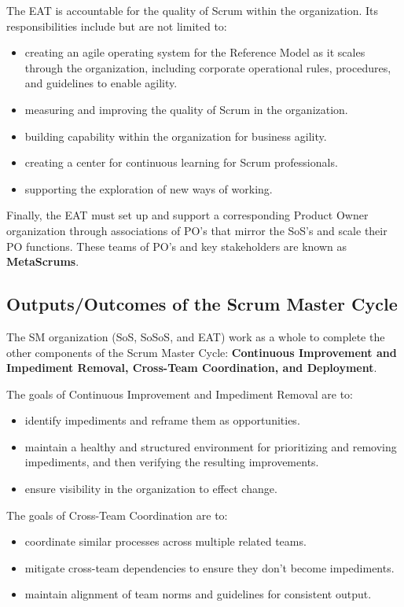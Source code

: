 \documentclass[12pt,a4paper,parskip=full]{scrartcl}
\begin{document}
The EAT is accountable for the quality of Scrum within the organization.
Its responsibilities include but are not limited to:
\begin{itemize}
\item creating an agile operating system for the Reference Model as it
scales through the organization, including corporate operational rules,
procedures, and guidelines to enable agility.
\item measuring and improving the quality of Scrum in the organization.
\item building capability within the organization for business agility.
\item creating a center for continuous learning for Scrum professionals.
\item supporting the exploration of new ways of working.
\end{itemize}
Finally, the EAT must set up and support a corresponding Product Owner
organization through associations of PO's that mirror the SoS's and scale
their PO functions. These teams of PO's and key stakeholders are known as
\textbf{MetaScrums}.

\subsection{Outputs/Outcomes of the Scrum Master Cycle}
The SM organization (SoS, SoSoS, and EAT) work as a whole to complete the
other components of the Scrum Master Cycle: \textbf{Continuous Improvement
and Impediment Removal, Cross-Team Coordination, and Deployment}.

The goals of Continuous Improvement and Impediment Removal are to:
\begin{itemize}
\item identify impediments and reframe them as opportunities.
\item maintain a healthy and structured environment for prioritizing and
removing impediments, and then verifying the resulting improvements.
\item ensure visibility in the organization to effect change.
\end{itemize}
The goals of Cross-Team Coordination are to:
\begin{itemize}
\item coordinate similar processes across multiple related teams.
\item mitigate cross-team dependencies to ensure they don't become
impediments.
\item maintain alignment of team norms and guidelines for consistent output.
\end{itemize}
\end{document}
